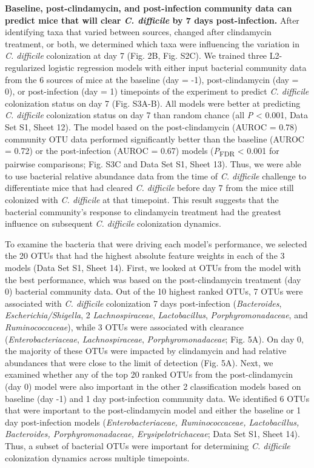 \documentclass[
  11pt,
]{article}
\begin{document}
\textbf{Baseline, post-clindamycin, and post-infection community data
can predict mice that will clear \emph{C. difficile} by 7 days
post-infection.} After identifying taxa that varied between sources,
changed after clindamycin treatment, or both, we determined which taxa
were influencing the variation in \emph{C. difficile} colonization at
day 7 (Fig. 2B, Fig. S2C). We trained three L2-regularized logistic
regression models with either input bacterial community data from the 6
sources of mice at the baseline (day = -1), post-clindamycin (day = 0),
or post-infection (day = 1) timepoints of the experiment to predict
\emph{C. difficile} colonization status on day 7 (Fig. S3A-B). All
models were better at predicting \emph{C. difficile} colonization status
on day 7 than random chance (all \emph{P} \textless{} 0.001, Data Set
S1, Sheet 12). The model based on the post-clindamycin (AUROC = 0.78)
community OTU data performed significantly better than the baseline
(AUROC = 0.72) or the post-infection (AUROC = 0.67) models
(\emph{P}\textsubscript{FDR} \textless{} 0.001 for pairwise comparisons;
Fig. S3C and Data Set S1, Sheet 13). Thus, we were able to use bacterial
relative abundance data from the time of \emph{C. difficile} challenge
to differentiate mice that had cleared \emph{C. difficile} before day 7
from the mice still colonized with \emph{C. difficile} at that
timepoint. This result suggests that the bacterial community's response
to clindamycin treatment had the greatest influence on subsequent
\emph{C. difficile} colonization dynamics.

To examine the bacteria that were driving each model's performance, we
selected the 20 OTUs that had the highest absolute feature weights in
each of the 3 models (Data Set S1, Sheet 14). First, we looked at OTUs
from the model with the best performance, which was based on the
post-clindamycin treatment (day 0) bacterial community data. Out of the
10 highest ranked OTUs, 7 OTUs were associated with \emph{C. difficile}
colonization 7 days post-infection (\emph{Bacteroides},
\emph{Escherichia/Shigella}, 2 \emph{Lachnospiraceae},
\emph{Lactobacillus}, \emph{Porphyromonadaceae}, and
\emph{Ruminococcaceae}), while 3 OTUs were associated with clearance
(\emph{Enterobacteriaceae}, \emph{Lachnospiraceae},
\emph{Porphyromonadaceae}; Fig. 5A). On day 0, the majority of these
OTUs were impacted by clindamycin and had relative abundances that were
close to the limit of detection (Fig. 5A). Next, we examined whether any
of the top 20 ranked OTUs from the post-clindamycin (day 0) model were
also important in the other 2 classification models based on baseline
(day -1) and 1 day post-infection community data. We identified 6 OTUs
that were important to the post-clindamycin model and either the
baseline or 1 day post-infection models (\emph{Enterobacteriaceae,
Ruminococcaceae, Lactobacillus, Bacteroides, Porphyromonadaceae,
Erysipelotrichaceae}; Data Set S1, Sheet 14). Thus, a subset of
bacterial OTUs were important for determining \emph{C. difficile}
colonization dynamics across multiple timepoints.
\end{document}
